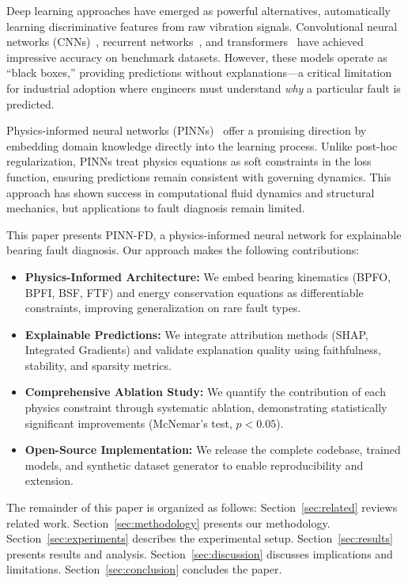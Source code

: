 \documentclass[journal]{IEEEtran}
\newcommand{\modelname}{PINN-FD}
\begin{document}
Deep learning approaches have emerged as powerful alternatives, automatically
learning discriminative features from raw vibration signals. Convolutional
neural networks (CNNs)~\cite{zhang2017cnn}, recurrent networks~\cite{zhao2017lstm},
and transformers~\cite{ding2022transformer} have achieved impressive accuracy
on benchmark datasets. However, these models operate as ``black boxes,''
providing predictions without explanations—a critical limitation for industrial
adoption where engineers must understand \emph{why} a particular fault is predicted.

Physics-informed neural networks (PINNs)~\cite{raissi2019physics} offer a
promising direction by embedding domain knowledge directly into the learning
process. Unlike post-hoc regularization, PINNs treat physics equations as soft
constraints in the loss function, ensuring predictions remain consistent with
governing dynamics. This approach has shown success in computational fluid
dynamics and structural mechanics, but applications to fault diagnosis remain
limited.

This paper presents \modelname{}, a physics-informed neural network for
explainable bearing fault diagnosis. Our approach makes the following
contributions:

\begin{itemize}
    \item \textbf{Physics-Informed Architecture:} We embed bearing kinematics
    (BPFO, BPFI, BSF, FTF) and energy conservation equations as differentiable
    constraints, improving generalization on rare fault types.
    
    \item \textbf{Explainable Predictions:} We integrate attribution methods
    (SHAP, Integrated Gradients) and validate explanation quality using
    faithfulness, stability, and sparsity metrics.
    
    \item \textbf{Comprehensive Ablation Study:} We quantify the contribution
    of each physics constraint through systematic ablation, demonstrating
    statistically significant improvements (McNemar's test, $p < 0.05$).
    
    \item \textbf{Open-Source Implementation:} We release the complete
    codebase, trained models, and synthetic dataset generator to enable
    reproducibility and extension.
\end{itemize}

The remainder of this paper is organized as follows: Section~\ref{sec:related}
reviews related work. Section~\ref{sec:methodology} presents our methodology.
Section~\ref{sec:experiments} describes the experimental setup.
Section~\ref{sec:results} presents results and analysis.
Section~\ref{sec:discussion} discusses implications and limitations.
Section~\ref{sec:conclusion} concludes the paper.
\end{document}
